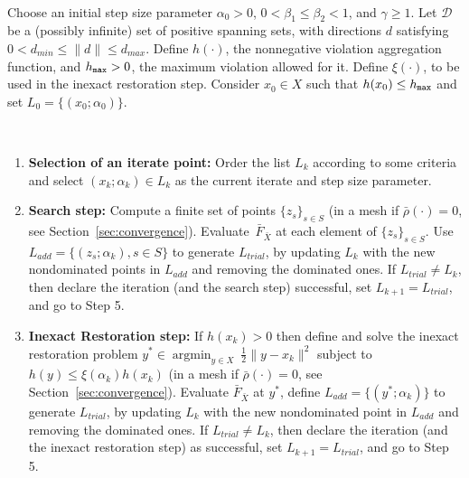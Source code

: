 \documentclass[12pt]{article}
\DeclareMathOperator*{\argmin}{argmin}
\newcommand{\set}[1]{\{#1\}}
\begin{document}
\begin{algorithm}
\begin{rm}
\begin{description}
{\small \vspace{1ex}
\item[Initialization] \ \\
Choose an initial step size parameter $\alpha_0 > 0$, $0 <
\beta_1\leq \beta_2 < 1$, and  $\gamma \geq 1$. Let $\mathcal{D}$
be a (possibly infinite) set of positive spanning sets, with
directions $d$ satisfying $0<d_{min}\leq\|d\|\leq d_{max}$. Define
$h(\cdot)$, the nonnegative violation aggregation function, and
$h_{\tt max}>0$, the maximum violation allowed for it. Define
$\xi(\cdot)$, to be used in the inexact restoration step. Consider
$x_0\in X$ such that $h(x_0)\leq h_{\tt max}$ and set
$L_0=\set{(x_0;\alpha_0)}$.\vspace{1ex}

\item[For $k=0,1,2,\ldots$] \ \\
\begin{enumerate}
\item[1.] {\bf Selection of an iterate point:} Order the list
$L_k$ according to some criteria and select $(x_k;\alpha_k)\in
L_k$ as the current iterate and step size parameter.\ \\

\item[2.] {\bf Search step:} Compute a finite set of points
$\{z_s\}_{s\in S}$ (in a mesh if $\bar\rho(\cdot)=0$, see
Section~\ref{sec:convergence}). Evaluate~$\bar{F}_{\bar{X}}$ at
each element of $\{z_s\}_{s\in S}$. Use $L_{add}=\{(z_s;\alpha_k),
s\in S\}$ to generate $L_{trial}$, by updating $L_k$ with the new
nondominated points in $L_{add}$ and removing the dominated ones.
If $L_{trial} \neq L_k$, then declare the iteration (and the
search step) successful,
set $L_{k+1}=L_{trial}$, and go to Step 5.\ \\

\item[3.] {\bf Inexact Restoration step:} If $h(x_k)>0$ then
define and solve the inexact restoration problem $y^*\in
\argmin_{y\in X}\  \frac{1}{2}\|y-x_k\|^2$ subject to $h(y)\leq
\xi(\alpha_k) h(x_k)$ (in a mesh if $\bar\rho(\cdot)=0$, see
Section~\ref{sec:convergence}). Evaluate $\bar{F}_{\bar{X}}$ at
$y^*$, define $L_{add}=\{(y^*;\alpha_k)\}$ to generate
$L_{trial}$, by updating $L_k$ with the new nondominated point in
$L_{add}$ and removing the dominated ones. If $L_{trial} \neq
L_k$, then declare the iteration (and the inexact restoration
step) as successful, set
$L_{k+1}=L_{trial}$, and go to Step 5.\ \\


\end{enumerate}}
\end{description}
\end{rm}
\end{algorithm}
\end{document}
